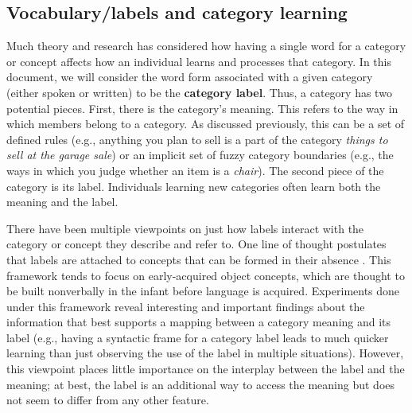 \documentclass[../dissertation.tex]{subfiles}
\begin{document}
\subsection{Vocabulary/labels and category learning}
	Much theory and research has considered how having a single word for a category or concept affects how an individual learns and processes that category. In this document, we will consider the word form associated with a given category (either spoken or written) to be the \textbf{category label}. Thus, a category has two potential pieces. First, there is the category's meaning. This refers to the way in which members belong to a category. As discussed previously, this can be a set of defined rules (e.g., anything you plan to sell is a part of the category \textit{things to sell at the garage sale}) or an implicit set of fuzzy category boundaries (e.g., the ways in which you judge whether an item is a \textit{chair}). The second piece of the category is its label. Individuals learning new categories often learn both the meaning and the label. \par
	There have been multiple viewpoints on just how labels interact with the category or concept they describe and refer to. One line of thought postulates that labels are attached to concepts that can be formed in their absence \citep{Gillette1999,Snedeker2004}. This framework tends to focus on early-acquired object concepts, which are thought to be built nonverbally in the infant before language is acquired. Experiments done under this framework reveal interesting and important findings about the information that best supports a mapping between a category meaning and its label (e.g., having a syntactic frame for a category label leads to much quicker learning than just observing the use of the label in multiple situations).  However, this viewpoint places little importance on the interplay between the label and the meaning; at best, the label is an additional way to access the meaning but does not seem to differ from any other feature. \par
\end{document}
